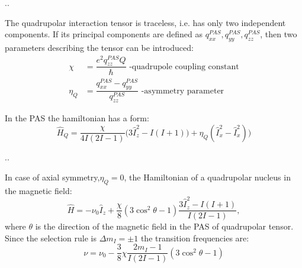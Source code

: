\documentclass[handout]{beamer}
\begin{document}
\begin{frame}{\thesection.\thesubsection. \insertsubsection}
	
	The quadrupolar interaction tensor is traceless, i.e. has only two independent components. If its principal components are defined as $q_{xx}^{PAS}, q_{yy}^{PAS}, q_{zz}^{PAS}$, then two parameters describing the tensor can be introduced:
	\begin{align}
	   \chi &= \dfrac{e^2 q_{zz}^{PAS} Q}{\hbar}  \text{   -quadrupole coupling constant} \\
	   \eta_Q &= \dfrac{q_{xx}^{PAS} - q_{yy}^{PAS}}{q_{zz}^{PAS}} \text{  -asymmetry parameter}
	\end{align}
	
	In the PAS the hamiltonian has a form:
	\begin{equation}
		\hat{H}_Q = \dfrac{\chi }{4 I (2I-1)}\Big(3 \hat{I}_z^2 - I(I+1) ) + \eta_Q(\hat{I}_x^2 -\hat{I}_x^2)  \Big)
	\end{equation}

\end{frame}	
\begin{frame}{\thesection.\thesubsection. \insertsubsection}


	In case of axial symmetry,$\eta_Q = 0$, the Hamiltonian of a quadrupolar nucleus in the magnetic field:
	\begin{equation}
	   \hat{H} = - \nu_0 \hat{I}_z + \dfrac{\chi}{8} (3 \cos^2 \theta - 1) \dfrac{3 \hat{I}_z^2  -I(I+1) }{I(2I-1)},
	\end{equation}
	where $\theta$ is the direction of the magnetic field in the PAS of quadrupolar tensor. Since the selection rule is $\Delta m_I = \pm1$ the transition frequencies are:
	\begin{equation}
	  \nu = \nu_0 -\dfrac{3}{8} \chi \dfrac{2 m_I -1}{I(2I -1)}(3 \cos^2 \theta - 1)
	\end{equation}
	 
\end{frame}
\end{document}

